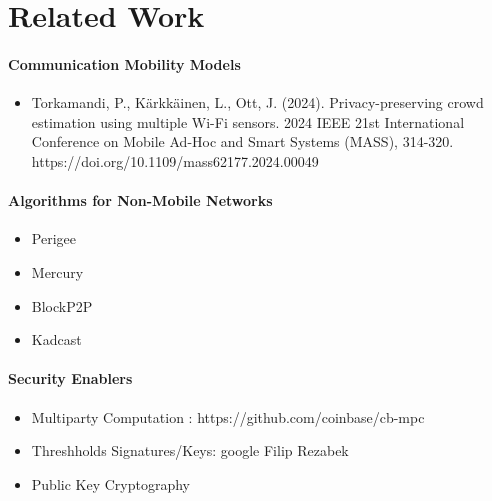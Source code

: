 \section{Related Work}

\begin{frame}
    \paragraph{Communication Mobility Models}
    \begin{itemize}
        \item Torkamandi, P., Kärkkäinen, L., Ott, J. (2024). Privacy-preserving crowd estimation using multiple Wi-Fi sensors. 2024 IEEE 21st International Conference on Mobile Ad-Hoc and Smart Systems (MASS), 314-320. https://doi.org/10.1109/mass62177.2024.00049
    \end{itemize}

    \paragraph{Algorithms for Non-Mobile Networks}
    \begin{itemize}
        \item Perigee
        \item Mercury
        \item BlockP2P
        \item Kadcast
    \end{itemize}

    \paragraph{Security Enablers}
    \begin{itemize}
        \item Multiparty Computation : https://github.com/coinbase/cb-mpc
        \item Threshholds Signatures/Keys: google Filip Rezabek
        \item Public Key Cryptography 
    \end{itemize}


\end{frame}
